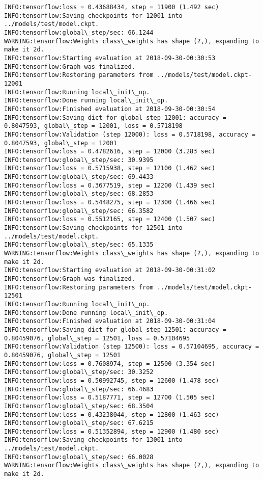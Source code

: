 \documentclass[11pt]{article}
\begin{document}
\begin{Verbatim}[commandchars=\\\{\}]
INFO:tensorflow:loss = 0.43688434, step = 11900 (1.492 sec)
INFO:tensorflow:Saving checkpoints for 12001 into ../models/test/model.ckpt.
INFO:tensorflow:global\_step/sec: 66.1244
WARNING:tensorflow:Weights class\_weights has shape (?,), expanding to make it 2d.
INFO:tensorflow:Starting evaluation at 2018-09-30-00:30:53
INFO:tensorflow:Graph was finalized.
INFO:tensorflow:Restoring parameters from ../models/test/model.ckpt-12001
INFO:tensorflow:Running local\_init\_op.
INFO:tensorflow:Done running local\_init\_op.
INFO:tensorflow:Finished evaluation at 2018-09-30-00:30:54
INFO:tensorflow:Saving dict for global step 12001: accuracy = 0.8047593, global\_step = 12001, loss = 0.5718198
INFO:tensorflow:Validation (step 12000): loss = 0.5718198, accuracy = 0.8047593, global\_step = 12001
INFO:tensorflow:loss = 0.4782616, step = 12000 (3.283 sec)
INFO:tensorflow:global\_step/sec: 30.9395
INFO:tensorflow:loss = 0.5715938, step = 12100 (1.462 sec)
INFO:tensorflow:global\_step/sec: 69.4433
INFO:tensorflow:loss = 0.3677519, step = 12200 (1.439 sec)
INFO:tensorflow:global\_step/sec: 68.2853
INFO:tensorflow:loss = 0.5448275, step = 12300 (1.466 sec)
INFO:tensorflow:global\_step/sec: 66.3582
INFO:tensorflow:loss = 0.5512165, step = 12400 (1.507 sec)
INFO:tensorflow:Saving checkpoints for 12501 into ../models/test/model.ckpt.
INFO:tensorflow:global\_step/sec: 65.1335
WARNING:tensorflow:Weights class\_weights has shape (?,), expanding to make it 2d.
INFO:tensorflow:Starting evaluation at 2018-09-30-00:31:02
INFO:tensorflow:Graph was finalized.
INFO:tensorflow:Restoring parameters from ../models/test/model.ckpt-12501
INFO:tensorflow:Running local\_init\_op.
INFO:tensorflow:Done running local\_init\_op.
INFO:tensorflow:Finished evaluation at 2018-09-30-00:31:04
INFO:tensorflow:Saving dict for global step 12501: accuracy = 0.80459076, global\_step = 12501, loss = 0.57104695
INFO:tensorflow:Validation (step 12500): loss = 0.57104695, accuracy = 0.80459076, global\_step = 12501
INFO:tensorflow:loss = 0.7608974, step = 12500 (3.354 sec)
INFO:tensorflow:global\_step/sec: 30.3252
INFO:tensorflow:loss = 0.50992745, step = 12600 (1.478 sec)
INFO:tensorflow:global\_step/sec: 66.4683
INFO:tensorflow:loss = 0.5187771, step = 12700 (1.505 sec)
INFO:tensorflow:global\_step/sec: 68.3504
INFO:tensorflow:loss = 0.43238044, step = 12800 (1.463 sec)
INFO:tensorflow:global\_step/sec: 67.6215
INFO:tensorflow:loss = 0.51352894, step = 12900 (1.480 sec)
INFO:tensorflow:Saving checkpoints for 13001 into ../models/test/model.ckpt.
INFO:tensorflow:global\_step/sec: 66.0028
WARNING:tensorflow:Weights class\_weights has shape (?,), expanding to make it 2d.

\end{Verbatim}
\end{document}
